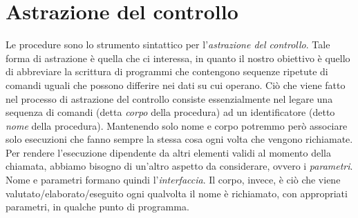 \documentclass[a4paper,oneside,titlepage]{book}
\begin{document}
\section{Astrazione del controllo}
Le procedure sono lo strumento sintattico per l'\textit{astrazione del controllo}. Tale forma di astrazione è quella che ci interessa, in quanto il nostro obiettivo è quello di abbreviare la scrittura di programmi che contengono sequenze ripetute di comandi uguali che possono differire nei dati su cui operano. Ciò che viene fatto nel processo di astrazione del controllo consiste essenzialmente nel legare una sequenza di comandi (detta \textit{corpo} della procedura) ad un identificatore (detto \textit{nome} della procedura). Mantenendo solo nome e corpo potremmo però associare solo esecuzioni che fanno sempre la stessa cosa ogni volta che vengono richiamate. Per rendere l'esecuzione dipendente da altri elementi validi al momento della chiamata, abbiamo bisogno di un'altro aspetto da considerare, ovvero i \textit{parametri}. Nome e parametri formano quindi l'\textit{interfaccia}. Il corpo, invece, è ciò che viene valutato/elaborato/eseguito ogni qualvolta il nome è richiamato, con appropriati parametri, in qualche punto di programma.
\end{document}
